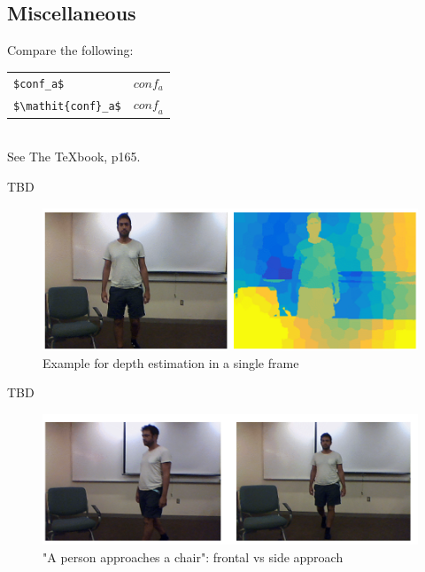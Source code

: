 \documentclass[10pt,twocolumn,letterpaper]{article}
\begin{document}
\subsection{Miscellaneous}

\noindent
Compare the following:\\
\begin{tabular}{ll}
 \verb'$conf_a$' &  $conf_a$ \\
 \verb'$\mathit{conf}_a$' & $\mathit{conf}_a$
\end{tabular}\\
See The \TeX book, p165.

TBD

\begin{figure}
\begin{center}
   \includegraphics[width=0.8\linewidth]{depth_estim_example.png}
   \end{center}
   \caption{Example for depth estimation in a single frame}
\label{fig_depth_frame}
\end{figure}

TBD

\begin{figure}
\begin{center}
   \includegraphics[width=0.8\linewidth]{front_vs_side_approach.png}
   \end{center}
   \caption{"A person approaches a chair": frontal vs side approach}
\label{fig_front_vs_side}
\end{figure}


{\small


}
\end{document}
